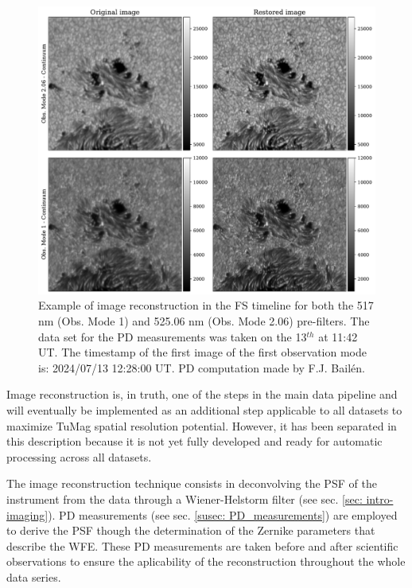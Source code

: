 \begin{figure}[h]
  \begin{minipage}[c]{0.67\textwidth}
    \includegraphics[width=\textwidth]{figures/Pipeline/Image_restoration.pdf}
  \end{minipage}\hfill
  \begin{minipage}[c]{0.29\textwidth}
    \caption[Image reconstruction.]{
     Example of image reconstruction in the FS timeline for both the 517 nm (Obs. Mode 1) and 525.06 nm (Obs. Mode 2.06) pre-filters. The data set for the PD measurements was taken on the 13$^{th}$ at 11:42 UT. The timestamp of the first image of the first observation mode is: 2024/07/13 12:28:00 UT. PD computation made by F.J. Bailén.
     \label{fig_pipeline:  image_restoration}} 
  \end{minipage}
\end{figure}

Image reconstruction is, in truth, one of the steps in the main data pipeline and will eventually be implemented as an additional step applicable to all datasets to maximize TuMag spatial resolution potential. However, it has been separated in this description because it is not yet fully developed and ready for automatic processing across all datasets.

The image reconstruction technique consists in deconvolving the PSF of the instrument from the data through a Wiener-Helstorm filter (see sec. \ref{sec: intro-imaging}). PD measurements (see sec. \ref{susec: PD_measurements}) are employed to derive the PSF though the determination of the Zernike parameters that describe the WFE. These PD measurements are taken before and after scientific observations to ensure the aplicability of the reconstruction throughout the whole data series.

